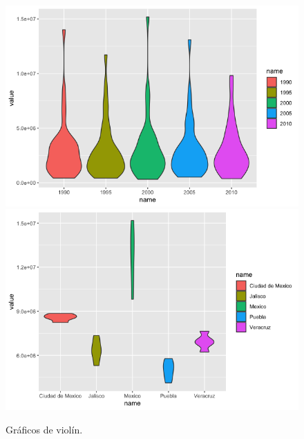 \documentclass[12pt,letterpaper]{article}
\begin{document}
\begin{figure}[h!]
\centering
\includegraphics[scale=0.42]{violin-anos.png}\includegraphics[scale=0.42]{violin-estados.png}
\caption{Gráficos de violín.}
\label{violin}
\end{figure}



\end{document}
